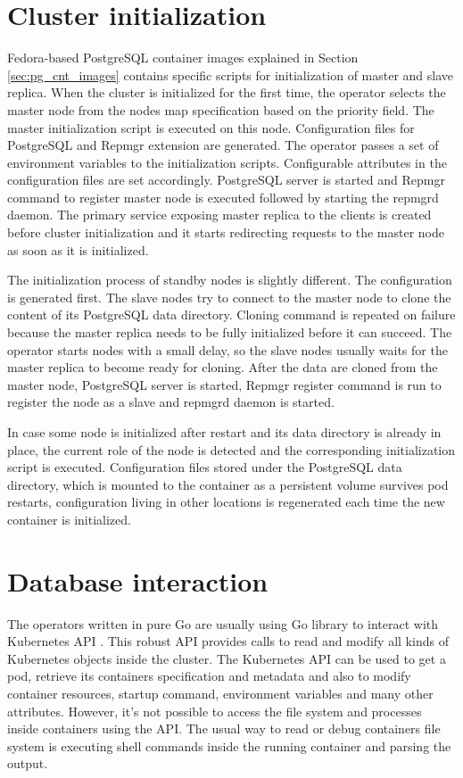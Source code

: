 \documentclass[
  digital, %
  twoside, %
  table,   %
  nolof,   %
  nolot,   %
]{fithesis3}
\begin{document}
\section{Cluster initialization}
Fedora-based PostgreSQL container images explained in Section \ref{sec:pg_cnt_images} contains specific scripts for initialization of master and slave replica. When the cluster is initialized for the first time, the operator selects the master node from the nodes map specification based on the priority field. The master initialization script is executed on this node. Configuration files for PostgreSQL and Repmgr extension are generated. The operator passes a set of environment variables to the initialization scripts. Configurable attributes in the configuration files are set accordingly. PostgreSQL server is started and Repmgr command to register master node is executed followed by starting the repmgrd daemon. The primary service exposing master replica to the clients is created before cluster initialization and it starts redirecting requests to the master node as soon as it is initialized.

The initialization process of standby nodes is slightly different. The configuration is generated first. The slave nodes try to connect to the master node to clone the content of its PostgreSQL data directory. Cloning command is repeated on failure because the master replica needs to be fully initialized before it can succeed. The operator starts nodes with a small delay, so the slave nodes usually waits for the master replica to become ready for cloning. After the data are cloned from the master node, PostgreSQL server is started, Repmgr register command is run to register the node as a slave and repmgrd daemon is started.

In case some node is initialized after restart and its data directory is already in place, the current role of the node is detected and the corresponding initialization script is executed. Configuration files stored under the PostgreSQL data directory, which is mounted to the container as a persistent volume survives pod restarts, configuration living in other locations is regenerated each time the new container is initialized.

\section{Database interaction}
The operators written in pure Go are usually using Go library to interact with Kubernetes API \cite{k8s-api}. This robust API provides calls to read and modify all kinds of Kubernetes objects inside the cluster. The Kubernetes API can be used to get a pod, retrieve its containers specification and metadata and also to modify container resources, startup command, environment variables and many other attributes. However, it’s not possible to access the file system and processes inside containers using the API. The usual way to read or debug containers file system is executing shell commands inside the running container and parsing the output.
\end{document}
